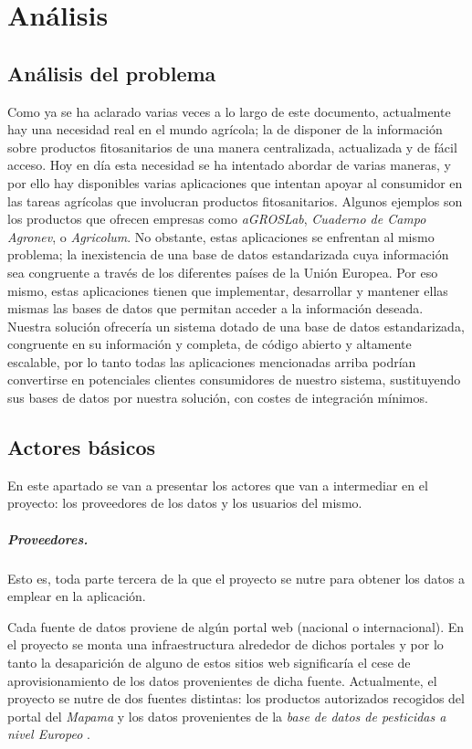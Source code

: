 \chapter{Análisis} \label{analisis}
\section{Análisis del problema} \label{analisis.problema}
Como ya se ha aclarado varias veces a lo largo de este documento, actualmente hay una necesidad real en el mundo agrícola; la de disponer de la información sobre productos fitosanitarios de una manera centralizada, actualizada y de fácil acceso. Hoy en día esta necesidad se ha intentado abordar de varias maneras, y por ello hay disponibles varias aplicaciones que intentan apoyar al consumidor en las tareas agrícolas que involucran productos fitosanitarios. Algunos ejemplos son los productos que ofrecen empresas como \textit{aGROSLab}, \textit{Cuaderno de Campo Agronev}, o \textit{Agricolum}. No obstante, estas aplicaciones se enfrentan al mismo problema; la inexistencia de una base de datos estandarizada cuya información sea congruente a través de los diferentes países de la Unión Europea. Por eso mismo, estas aplicaciones tienen que implementar, desarrollar y mantener ellas mismas las bases de datos que permitan acceder a la información deseada. Nuestra solución ofrecería un sistema dotado de una base de datos estandarizada, congruente en su información y completa, de código abierto y altamente escalable, por lo tanto todas las aplicaciones mencionadas arriba podrían convertirse en potenciales clientes consumidores de nuestro sistema, sustituyendo sus bases de datos por nuestra solución, con costes de integración mínimos.

\section{Actores básicos} \label{analisis.marco}
En este apartado se van a presentar los actores que van a intermediar en el proyecto: los proveedores de los datos y los usuarios del mismo. 
\paragraph*{Proveedores.} Esto es, toda parte tercera de la que el proyecto se nutre para obtener los datos a emplear en la aplicación. \par Cada fuente de datos proviene de algún portal web (nacional o internacional). En el proyecto se monta una infraestructura alrededor de dichos portales y por lo tanto la desaparición de alguno de estos sitios web significaría el cese de aprovisionamiento de los datos provenientes de dicha fuente. Actualmente, el proyecto se nutre de dos fuentes distintas: los productos autorizados recogidos del portal del \textit{Mapama} \cite{mapama} y los datos provenientes de la \textit{base de datos de pesticidas a nivel Europeo} \cite{pesticidesdb}.

